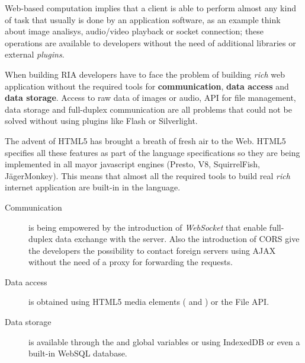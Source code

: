 


Web-based computation implies that a client is able to perform almost any kind of task that usually
is done by an application software, as an example think about image analisys, audio/video playback
or socket connection; these operations are available to developers without the need of additional
libraries or external \emph{plugins}.

When building \ac{RIA} developers have to face the problem of building \emph{rich} web application
without the required tools for \textbf{communication}, \textbf{data access} and \textbf{data storage}.
Access to raw data of images or audio, API for file management, data storage and full-duplex
communication are all problems that could not be solved without using plugins like Flash or Silverlight.

The advent of HTML5 has brought a breath of fresh air to the Web. HTML5 specifies all these features
as part of the language specifications so they are being implemented in all mayor javascript
engines (Presto, V8, SquirrelFish, JägerMonkey). This means that almost all the required tools to build
real \emph{rich} internet application are built-in in the \js{} language.

\begin{description}
  \item[Communication] is being empowered by the introduction of \emph{WebSocket} that enable full-duplex
  data exchange with the server. Also the introduction of \ac{CORS} give the developers the possibility
  to contact foreign servers using \ac{AJAX} without the need of a proxy for forwarding the requests.
  \item[Data access] is obtained using HTML5 media elements ( and )
  or the File API.
  \item[Data storage] is available through the  and 
  global variables or using IndexedDB or even a built-in WebSQL database.
\end{description}


